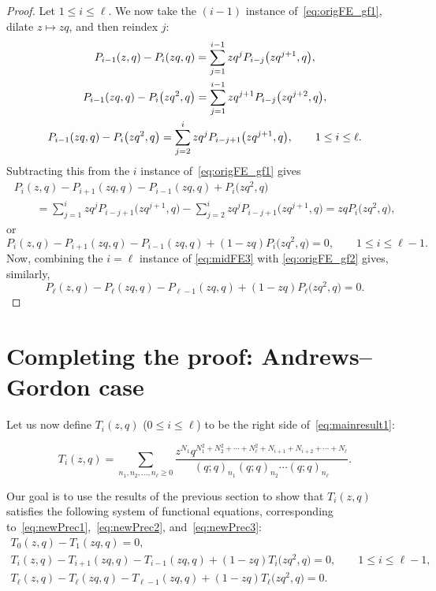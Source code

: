 \documentclass[10pt,a4paper]{amsart}
\numberwithin{equation}{section}
\theoremstyle{definition}
\begin{document}
\begin{proof}
Let $1\le i \le \ell$. We now take the $(i-1)$ instance of~\eqref{eq:origFE_gf1}, dilate $z\mapsto zq$, and then reindex $j$:
\begin{gather}
P_{i-1}(z,q) - P_{i}(zq,q) = \sum_{j=1}^{i-1} zq^j P_{i-j}\bigl(zq^{j+1},q\bigr), \notag \\
P_{i-1}(zq,q) - P_{i}\bigl(zq^2,q\bigr) = \sum_{j=1}^{i-1} zq^{j+1} P_{i-j}\bigl(zq^{j+2},q\bigr), \notag \\
P_{i-1}(zq,q) - P_{i}\bigl(zq^2,q\bigr) = \sum_{j=2}^{i} zq^{j} P_{i-j+1}\bigl(zq^{j+1},q\bigr), \qquad 1 \le i \le \ell. \label{eq:midFE3}
\end{gather}
Subtracting this from the $i$ instance of~\eqref{eq:origFE_gf1} gives
\begin{gather*}
P_i(z,q) - P_{i+1}(zq,q) - P_{i-1}(zq,q) + P_{i}\bigl(zq^2,q\bigr) \\
\qquad = \sum_{j=1}^i zq^j P_{i-j+1}\bigl(zq^{j+1},q\bigr) -\sum_{j=2}^{i} zq^{j} P_{i-j+1}\bigl(zq^{j+1},q\bigr) = zqP_i\bigl(zq^2,q\bigr), \label{eq:a7}
\end{gather*}
or
\begin{equation*}
P_i(z,q) - P_{i+1}(zq,q) - P_{i-1}(zq,q) + (1-zq)P_{i}\bigl(zq^2,q\bigr) =0, \qquad 1 \le i \le \ell-1.
\end{equation*}
Now, combining the $i=\ell$ instance of \eqref{eq:midFE3} with \eqref{eq:origFE_gf2} gives, similarly,
\begin{equation}
P_\ell(z,q) - P_\ell(zq,q) -P_{\ell-1}(zq,q) + (1-zq) P_{\ell}\bigl(zq^2,q\bigr) = 0. \tag*{\qed}
\end{equation}
\renewcommand{\qed}{}
\end{proof}

\section{Completing the proof: Andrews--Gordon case}\label{sec:comp}

Let us now define $T_i(z,q)$ ($0\le i \le \ell$) to be the right side of~\eqref{eq:mainresult1}:

\begin{equation} \label{eq:Tdef}
T_i(z,q)=\sum_{n_1,n_2,\dots,n_{\ell}\ge 0} \frac{z^{N_1}q^{N_1^2+N_2^2+\cdots+N_{\ell}^2+N_{i+1}+N_{i+2}+\cdots+N_{\ell}}}{(q;q)_{n_1}(q;q)_{n_2}\cdots(q;q)_{n_{\ell}}}.
\end{equation}

Our goal is to use the results of the previous section to show that $T_i(z,q)$ satisfies the following system of functional equations, corresponding to~\eqref{eq:newPrec1},~\eqref{eq:newPrec2}, and~\eqref{eq:newPrec3}:
\begin{gather}
T_0(z,q)-T_1(zq,q) =0, \label{eq:newTrec1} \\
T_i(z,q) - T_{i+1}(zq,q) - T_{i-1}(zq,q) + (1-zq)T_{i}\bigl(zq^2,q\bigr) =0, \qquad 1 \le i \le \ell-1, \label{eq:newTrec2} \\
T_\ell(z,q) - T_\ell(zq,q) -T_{\ell-1}(zq,q) + (1-zq) T_{\ell}\bigl(zq^2,q\bigr) = 0. \label{eq:newTrec3}
\end{gather}
\end{document}

